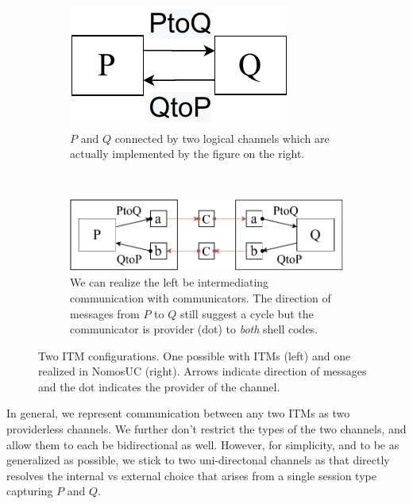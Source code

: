 \begin{figure}
	\begin{subfigure}{0.5\textwidth}
	\centering
	\includegraphics[scale=0.4]{figures/p_and_q.pdf}
	\caption{$P$ and $Q$ connected by two logical channels which are actually implemented by the figure on the right.}
	\label{fig:pandq}
	\end{subfigure}
	\\
	\begin{subfigure}{0.5\textwidth}
	\centering
	\includegraphics[scale=0.4]{figures/new_p_and_q.pdf}
	\caption{We can realize the left be intermediating communication with communicators. The direction of messages from $P$ to $Q$ still suggest a cycle but the communicator is provider (dot) to \emph{both} shell codes.}
	\label{fig:newpandq}
	\end{subfigure}
	\caption{Two ITM configurations. One possible with ITMs (left) and one realized in NomosUC (right). Arrows indicate direction of messages and the dot indicates the provider of the channel.}
	\vspace{-5mm}
\end{figure}

In general, we represent communication between any two ITMs as two providerless channels.
We further don't restrict the types of the two channels, and allow them to each be bidirectional as well.
However, for simplicity, and to be as generalized as possible, we stick to two uni-directonal channels as that directly resolves the internal vs external choice that arises from a single session type capturing $P$ and $Q$.

